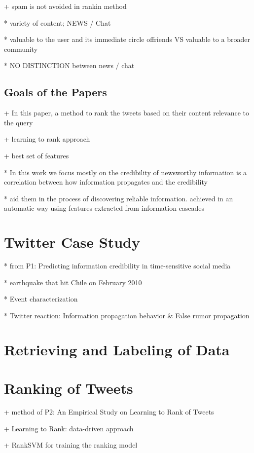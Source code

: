 \documentclass{proseminar}
\begin{document}
+ spam is not avoided in rankin method

* variety of content; NEWS / Chat

* valuable to the user and its immediate circle offriends VS  valuable to a broader community

* NO DISTINCTION between news / chat




\subsection*{Goals of the Papers}
+ In this paper,  a method to rank the tweets  based on their content relevance to the query

+  learning to rank approach

+  best set of features

* In this work we focus mostly on the credibility of newsworthy information is a correlation between how information propagates and the credibility 

* aid them in the process of discovering reliable information.  achieved in an automatic way using features extracted from information cascades





\section{Twitter Case Study}
* from P1: Predicting information credibility in time-sensitive social media

* earthquake that hit Chile on February 2010

*  Event characterization

*  Twitter reaction: Information propagation behavior \& False rumor propagation

\section{Retrieving and Labeling of Data}



\section{Ranking of Tweets}
+ method of P2: An Empirical Study on Learning to Rank of Tweets

+ Learning to Rank: data-driven approach

+ RankSVM for training the ranking model
\end{document}
